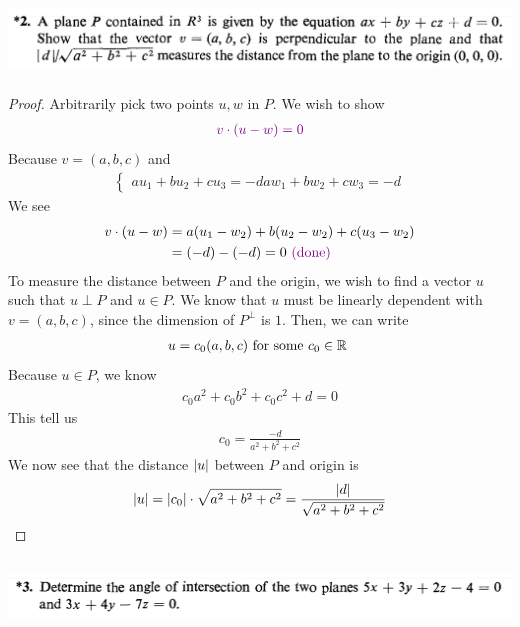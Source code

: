 \documentclass{report}
\begin{document}
\begin{question}{}{}
\includegraphics[height=2cm,width=18cm]{qu10}
\end{question}
\begin{proof}
Arbitrarily pick two points $u,w$ in  $P$. We wish to show 
\begin{align*}
  \textcolor{violet}{v\cdot (u-w)=0}
\end{align*}
Because $v=(a,b,c)$ and 
\begin{align*}
\begin{cases}
  au_1+b u_2+cu_3=-d
  aw_1+b w_2+cw_3=-d
\end{cases}
\end{align*}
We see
\begin{align*}
v\cdot (u-w)&= a(u_1-w_2)+b(u_2-w_2)+c(u_3-w_2)\\
&=(-d)-(-d)=0\textcolor{violet}{\text{ (done) }}
\end{align*}
To measure the distance between $P$ and the origin, we wish to find a vector $u$ such that  $u\perp P$ and $u \in P$. We know that $u$ must be linearly dependent with  $v=(a,b,c)$, since the dimension of  $P^\perp$ is $1$. Then, we can write
\begin{align*}
u=c_0(a,b,c)\text{ for some $c_0\in\mathbb{R}$ }
\end{align*}
Because $u \in P$, we know 
\begin{align*}
c_0a^2+c_0b^2+c_0c^2+d=0
\end{align*}
This tell us 
\begin{align*}
c_0=\frac{-d}{a^2+b^2+c^2}
\end{align*}
We now see that the distance $\left|u\right|$ between $P$ and origin is 
\begin{align*}
\left|u\right|=\left|c_0\right|\cdot \sqrt{a^2+b^2+c^2}= \frac{\left|d\right|}{\sqrt{a^2+b^2+c^2} }
\end{align*}

\end{proof}
\begin{question}{}{}
\includegraphics[height=2cm,width=18cm]{qu11}
\end{question}
\end{document}
